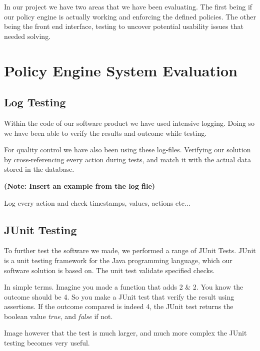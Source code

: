 In our project we have two areas that we have been evaluating. The first being if our policy engine is actually working and enforcing the defined policies. The other being the front end interface, testing to uncover potential usability issues that needed solving.

\section{Policy Engine System Evaluation}
\label{policy-engine-system-evaluation}

\subsection{Log Testing}
\label{log-test}
Within the code of our software product we have used intensive logging. Doing so we have been able to verify the results and outcome while testing.

For quality control we have also been using these log-files. Verifying our solution by cross-referencing every action during tests, and match it with the actual data stored in the database.

\textbf{(Note: Insert an example from the log file)}

Log every action and check timestamps, values, actions etc...

\subsection{JUnit Testing}
To further test the software we made, we performed a range of JUnit Tests. JUnit is a unit testing framework for the Java programming language, which our software solution is based on. The unit test validate specified checks. 

In simple terms. Imagine you made a function that adds 2 \& 2. You know the outcome should be 4. So you make a JUnit test that verify the result using assertions. If the outcome compared is indeed 4, the JUnit test returns the boolean value \textit{true}, and \textit{false} if not.

Image however that the test is much larger, and much more complex the JUnit testing becomes very useful.

